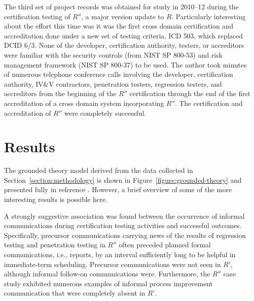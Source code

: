 \documentclass[10pt,letterpaper,conference]{IEEEtran}
\begin{document}
The third set of project records was obtained for study in 2010--12 during the certification
testing of $R''$, a major version update to $R$.  Particularly interesting about the effort this
time was it was the first cross domain certification and accreditation done under a new set of
testing criteria, ICD 503, which replaced DCID 6/3.  None of the developer, certification authority,
testers, or accreditors were familiar with the security controls (from NIST SP 800-53) and risk
management framework (NIST SP 800-37) to be used.  The author took minutes of numerous telephone
conference calls involving the developer, certification authority, IV\&V contractors, penetration
testers, regression testers, and accreditors from the beginning of the $R''$ certification through
the end of the first accreditation of a cross domain system incorporating $R''$.  The certification
and accreditation of $R''$ were completely successful.

\section{Results}

The grounded theory model derived from the data collected in Section~\ref{section:methodology} is
shown in Figure~\ref{figure:grounded-theory} and presented fully in reference \cite{Loughry2012b}.
However, a brief overview of some of the more interesting results is possible here.

A strongly suggestive association was found between the occurrence of informal communications
during certification testing activities and successful outcomes.  Specifically, precursor
communications carrying news of the results of regression testing and penetration testing in $R''$
often preceded planned formal communications, i.e., reports, by an interval sufficiently long to be
helpful in immediate-term scheduling.  Precursor communications were not seen in $R'$, although
informal follow-on communications were.  Furthermore, the $R''$ case study exhibited numerous
examples of informal process improvement communication that were completely absent in $R'$.
\end{document}
